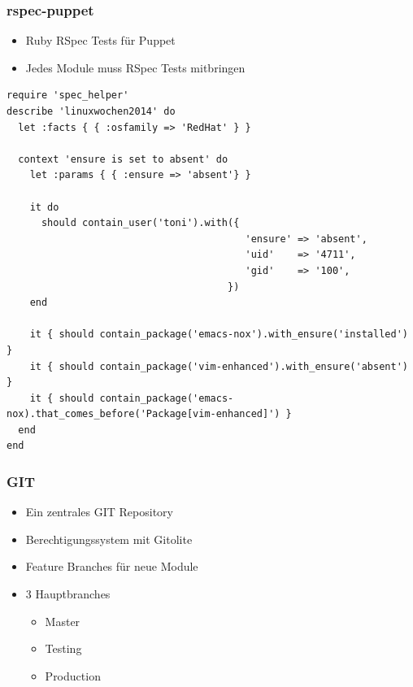 \documentclass{beamer}
\begin{document}
\begin{frame}
\end{frame}

\begin{frame}
\end{frame}

\begin{frame}[fragile]
  \frametitle{rspec-puppet}

  \begin{itemize}
  \item Ruby RSpec Tests für Puppet
  \item Jedes Module muss RSpec Tests mitbringen
  \end{itemize}

  \begin{lstlisting}
require 'spec_helper'
describe 'linuxwochen2014' do
  let :facts { { :osfamily => 'RedHat' } }

  context 'ensure is set to absent' do
    let :params { { :ensure => 'absent'} }

    it do
      should contain_user('toni').with({
                                         'ensure' => 'absent',
                                         'uid'    => '4711',
                                         'gid'    => '100',
                                      })
    end

    it { should contain_package('emacs-nox').with_ensure('installed') }
    it { should contain_package('vim-enhanced').with_ensure('absent') }
    it { should contain_package('emacs-nox).that_comes_before('Package[vim-enhanced]') }
  end
end
  \end{lstlisting}

\end{frame}

\begin{frame}
\end{frame}

\begin{frame}
\end{frame}

\begin{frame}
  \frametitle{GIT}

  \begin{itemize}
  \item Ein zentrales GIT Repository
  \item Berechtigungssystem mit Gitolite
  \item Feature Branches für neue Module
  \item 3 Hauptbranches
    \begin{itemize}
    \item Master
    \item Testing
    \item Production
    \end{itemize}
  \end{itemize}
\end{frame}
\end{document}
